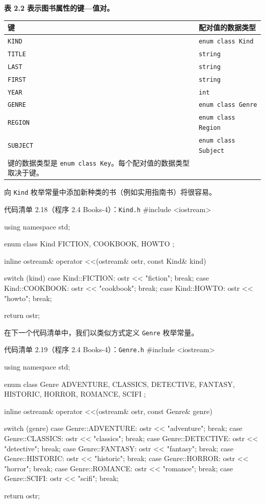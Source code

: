 \begin{center}
{\bfseries 表 2.2 表示图书属性的键—值对。}\par\vspace{3bp}
\begin{tabularx}{\textwidth}{XX}
\toprule
键 & 配对值的数据类型 \\
\midrule
\texttt{KIND} & \texttt{enum class Kind} \\
\texttt{TITLE} & \texttt{string} \\
\texttt{LAST} & \texttt{string} \\
\texttt{FIRST} & \texttt{string} \\
\texttt{YEAR} & \texttt{int} \\
\texttt{GENRE} & \texttt{enum class Genre} \\
\texttt{REGION} & \texttt{enum class Region} \\
\texttt{SUBJECT} & \texttt{enum class Subject} \\
键的数据类型是 \texttt{enum class Key}。每个配对值的数据类型取决于键。 \\
\bottomrule
\end{tabularx}
\end{center}

向 \texttt{Kind} 枚举常量中添加新种类的书（例如实用指南书）将很容易。

\begin{codeboxt}{代码清单 2.18（程序 2.4 Books-4）：\texttt{Kind.h}}
#include <iostream>

using namespace std;

enum class Kind
{
    FICTION, COOKBOOK, HOWTO
};

inline ostream& operator <<(ostream& ostr, const Kind& kind)
{
    switch (kind)
    {
        case Kind::FICTION:  ostr << "fiction";  break;
        case Kind::COOKBOOK: ostr << "cookbook"; break;
        case Kind::HOWTO:    ostr << "howto";    break;
    }

    return ostr;
}
\end{codeboxt}

在下一个代码清单中，我们以类似方式定义 \texttt{Genre} 枚举常量。

\begin{codeboxt}{代码清单 2.19（程序 2.4 Books-4）：\texttt{Genre.h}}
#include <iostream>

using namespace std;

enum class Genre
{
    ADVENTURE, CLASSICS, DETECTIVE, FANTASY, HISTORIC,
    HORROR, ROMANCE, SCIFI
};

inline ostream& operator <<(ostream& ostr, const Genre& genre)
{
    switch (genre)
    {
        case Genre::ADVENTURE: ostr << "adventure"; break;
        case Genre::CLASSICS:  ostr << "classics";  break;
        case Genre::DETECTIVE: ostr << "detective"; break;
        case Genre::FANTASY:   ostr << "fantasy";   break;
        case Genre::HISTORIC:  ostr << "historic";  break;
        case Genre::HORROR:    ostr << "horror";    break;
        case Genre::ROMANCE:   ostr << "romance";   break;
        case Genre::SCIFI:     ostr << "scifi";     break;
    }

    return ostr;
}
\end{codeboxt}

